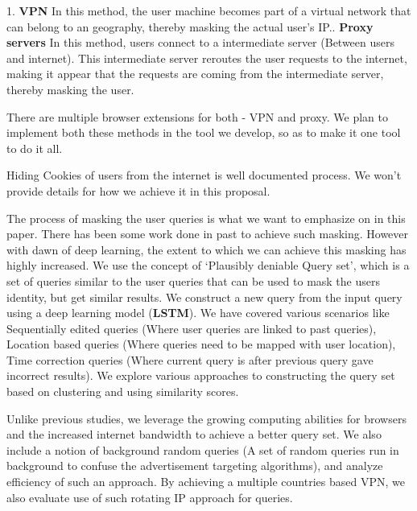 \documentclass[11pt]{article}
\begin{document}
1. \textbf{VPN}\newline\newline
In this method, the user machine becomes part of a virtual network that can belong to an geography, thereby masking the actual user’s IP.\newline{}. \textbf{Proxy servers}\newline\newline
In this method, users connect to a intermediate server (Between users and internet). This intermediate server reroutes the user requests to the internet, making it appear that the requests are coming from the intermediate server, thereby masking the user.\newline

There are multiple browser extensions for both - VPN and proxy. We plan to implement both these methods in the tool we develop, so as to make it one tool to do it all.\newline 

Hiding Cookies of users from the internet is well documented process. We won’t provide details for how we achieve it in this proposal. \newline

The process of masking the user queries is what we want to emphasize on in this paper. There has been some work done in past to achieve such masking. However with dawn of deep learning, the extent to which we can achieve this masking has highly increased. We use the concept of ‘Plausibly deniable Query set’, which is a set of queries similar to the user queries that can be used to mask the users identity, but get similar results. We construct a new query from the input query using a deep learning model (\textbf{LSTM}). 
We have covered various scenarios like Sequentially edited queries (Where user queries are linked to past queries), Location based queries (Where queries need to be mapped with user location), Time correction queries (Where current query is after previous query gave incorrect results). We explore various approaches to constructing the query set based on clustering and using similarity scores.\newline 

Unlike previous studies, we leverage the growing computing abilities for browsers and the increased internet bandwidth to achieve a better query set. We also include a notion of background random queries (A set of random queries run in background to confuse the advertisement targeting algorithms), and analyze efficiency of such an approach. By achieving a multiple countries based VPN, we also evaluate use of such rotating IP approach for queries.\newline
\end{document}
